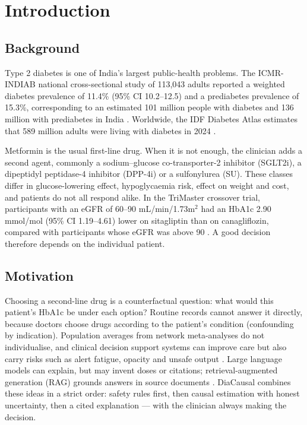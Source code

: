 \chapter{Introduction}\label{chap1}
\newpage
\section{Background}
Type 2 diabetes is one of India's largest public-health problems. The ICMR-INDIAB national cross-sectional study of 113{,}043 adults reported a weighted diabetes prevalence of 11.4\% (95\% CI 10.2--12.5) and a prediabetes prevalence of 15.3\%, corresponding to an estimated 101 million people with diabetes and 136 million with prediabetes in India \cite{anjana2023}. Worldwide, the IDF Diabetes Atlas estimates that 589 million adults were living with diabetes in 2024 \cite{idf2025}.

Metformin is the usual first-line drug. When it is not enough, the clinician adds a second agent, commonly a sodium--glucose co-transporter-2 inhibitor (SGLT2i), a dipeptidyl peptidase-4 inhibitor (DPP-4i) or a sulfonylurea (SU). These classes differ in glucose-lowering effect, hypoglycaemia risk, effect on weight and cost, and patients do not all respond alike. In the TriMaster crossover trial, participants with an eGFR of 60--90 mL/min/1.73m$^2$ had an HbA1c 2.90 mmol/mol (95\% CI 1.19--4.61) lower on sitagliptin than on canagliflozin, compared with participants whose eGFR was above 90 \cite{shields2023}. A good decision therefore depends on the individual patient.

\section{Motivation}
Choosing a second-line drug is a counterfactual question: what would this patient's HbA1c be under each option? Routine records cannot answer it directly, because doctors choose drugs according to the patient's condition (confounding by indication). Population averages from network meta-analyses \cite{tsapas2020,palmer2016} do not individualise, and clinical decision support systems can improve care but also carry risks such as alert fatigue, opacity and unsafe output \cite{sutton2020}. Large language models can explain, but may invent doses or citations; retrieval-augmented generation (RAG) grounds answers in source documents \cite{lewis2020,zakka2024}. DiaCausal combines these ideas in a strict order: safety rules first, then causal estimation with honest uncertainty, then a cited explanation --- with the clinician always making the decision.

